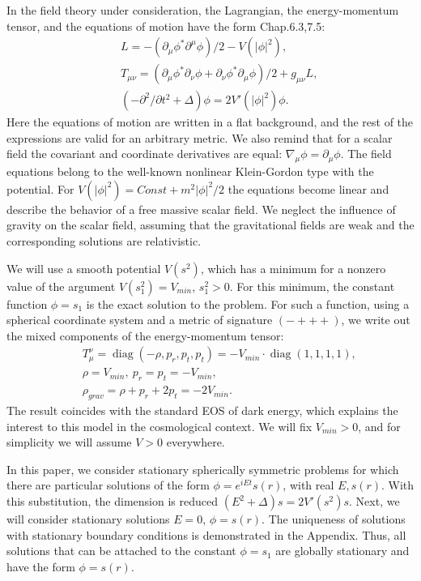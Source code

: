 \documentclass{article}
\def\df{\partial}
\def\diag{\mathop{\mbox{diag}}}
\begin{document}
In the field theory under consideration, the Lagrangian, the energy-momentum tensor, and the equations of motion have the form \cite {Blau} Chap.6.3,7.5: 
\begin{eqnarray}
&&L=-(\df_\mu \phi^* \df^\mu \phi)/2 - V(|\phi|^2),\\
&&T_{\mu\nu}=(\df_\mu \phi^* \df_\nu \phi + \df_\nu \phi^* \df_\mu \phi)/2+g_{\mu\nu}L,\\
&&(-\df^2/\df t^2+\Delta)\phi=2V'(|\phi|^2)\phi.
\end{eqnarray}
Here the equations of motion are written in a flat background, and the rest of the expressions are valid for an arbitrary metric. We also remind that for a scalar field the covariant and coordinate derivatives are equal: $ \nabla_ \mu \phi = \df_ \mu \phi $. The field equations belong to the well-known nonlinear Klein-Gordon type with the potential. For $ V (| \phi | ^ 2) = Const + m ^ 2 | \phi | ^ 2/2 $ the equations become linear and describe the behavior of a free massive scalar field. We neglect the influence of gravity on the scalar field, assuming that the gravitational fields are weak and the corresponding solutions are relativistic.

We will use a smooth potential $ V (s ^ 2) $, which has a minimum for a nonzero value of the argument $ V (s_1 ^ 2) = V_ {min} $, $ s_1 ^ 2> 0 $. For this minimum, the constant function $ \phi = s_1 $ is the exact solution to the problem. For such a function, using a spherical coordinate system and a metric of signature $ (- +++) $, we write out the mixed components of the energy-momentum tensor: 
\begin{eqnarray}
&&T_\mu^\nu=\diag(-\rho,p_r,p_t,p_t)=-V_{min}\cdot\diag(1,1,1,1),\\
&&\rho=V_{min},\ p_r=p_t=-V_{min},\\
&&\rho_{grav}=\rho+p_r+2p_t=-2V_{min}.
\end{eqnarray}
The result coincides with the standard EOS of dark energy, which explains the interest to this model in the cosmological context. We will fix $ V_ {min}> 0 $, and for simplicity we will assume $ V> 0 $ everywhere.

In this paper, we consider stationary spherically symmetric problems for which there are particular solutions of the form $ \phi = e ^ {iEt} s (r) $, with real $ E, s (r) $. With this substitution, the dimension is reduced $ (E ^ 2 + \Delta) s = 2V '(s ^ 2) s $. Next, we will consider stationary solutions $ E = 0 $, $ \phi = s (r) $. The uniqueness of solutions with stationary boundary conditions is demonstrated in the Appendix. Thus, all solutions that can be attached to the constant $ \phi = s_1 $ are globally stationary and have the form $ \phi = s (r) $.
\end{document}
